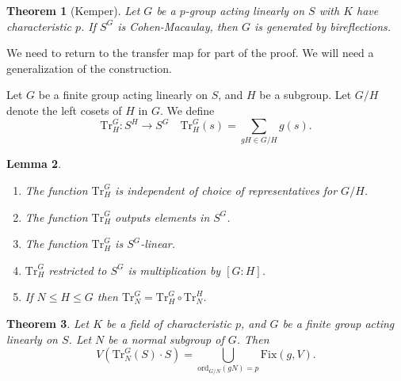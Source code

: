 \documentclass[12pt]{amsart}
\newtheorem{theorem}{Theorem}[section]
\newtheorem{lemma}[theorem]{Lemma}
\theoremstyle{definition}
\numberwithin{equation}{theorem}
\def\to{\longrightarrow}
\begin{document}
\begin{theorem}[Kemper] Let $G$ be a $p$-group acting linearly on $S$ with $K$ have characteristic $p$. If $S^G$ is Cohen-Macaulay, then $G$ is generated by bireflections.
\end{theorem}


We need to return to the transfer map for part of the proof. We will need a generalization of the construction.

Let $G$ be a finite group acting linearly on $S$, and $H$ be a subgroup. Let $G/H$ denote the left cosets of $H$ in $G$. We define
\[ \mathrm{Tr}^G_H : S^H \to S^G \quad \mathrm{Tr}^G_H(s) = \sum_{gH \in G/H} g(s).\]
\begin{lemma}
\begin{enumerate}
\item The function $\mathrm{Tr}^G_H$ is independent of choice of representatives for $G/H$.
\item The function $\mathrm{Tr}^G_H$ outputs elements in $S^G$.
\item The function $\mathrm{Tr}^G_H$ is $S^G$-linear.
\item $\mathrm{Tr}^G_H$ restricted to $S^G$ is multiplication by $[G:H]$.
\item If $N\leq H \leq G$ then $\mathrm{Tr}^G_N= \mathrm{Tr}^G_H \circ \mathrm{Tr}^H_N$.
\end{enumerate}
\end{lemma}

\begin{theorem} Let $K$ be a field of characteristic $p$, and $G$ be a finite group acting linearly on $S$. Let $N$ be a normal subgroup of $G$. Then
\[ V( \mathrm{Tr}^G_N(S) \cdot S) = \bigcup_{\mathrm{ord}_{G/N}(gN) = p} \mathrm{Fix}(g,V).\]
\end{theorem}
\end{document}

